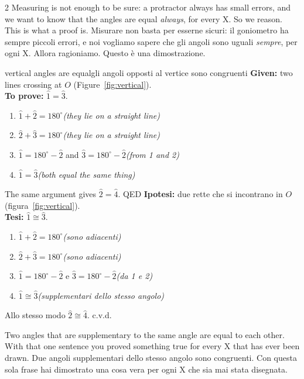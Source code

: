 \documentclass[10pt,a4paper,oneside]{book}
\newif\ifIT
\newenvironment{bi}%
  {\begin{paracol}{2}\global\ITfalse\selectlanguage{english}}%
  {\end{paracol}}
\newcommand{\IT}{\switchcolumn\global\ITtrue\selectlanguage{italian}}
\newcommand{\av}[1]{\widehat{#1}}           %
\newcommand{\step}[2]{\item #1\hfill{\small\color{slate}\itshape(#2)}}
\newenvironment{steps}{\begin{enumerate}[label=\arabic*., leftmargin=1.5em, itemsep=1pt]}{\end{enumerate}}
\begin{document}
\begin{bi}
Measuring is not enough to be sure: a protractor always has small errors, and we want to know that the angles are equal \emph{always}, for every X. So we reason. This is what a proof is.
\IT
Misurare non basta per esserne sicuri: il goniometro ha sempre piccoli errori, e noi vogliamo sapere che gli angoli sono uguali \emph{sempre}, per ogni X. Allora ragioniamo. Questo è una dimostrazione.
\end{bi}

\begin{proofbox}{vertical angles are equal}{gli angoli opposti al vertice sono congruenti}
\textbf{Given:} two lines crossing at $O$ (Figure~\ref{fig:vertical}).\\
\textbf{To prove:} $\av{1} = \av{3}$.
\begin{steps}
\step{$\av{1} + \av{2} = 180^\circ$}{they lie on a straight line}
\step{$\av{2} + \av{3} = 180^\circ$}{they lie on a straight line}
\step{$\av{1} = 180^\circ - \av{2}$ and $\av{3} = 180^\circ - \av{2}$}{from 1 and 2}
\step{$\av{1} = \av{3}$}{both equal the same thing}
\end{steps}
The same argument gives $\av{2} = \av{4}$. \hfill QED
\tcblower
\textbf{Ipotesi:} due rette che si incontrano in $O$ (figura~\ref{fig:vertical}).\\
\textbf{Tesi:} $\av{1} \cong \av{3}$.
\begin{steps}
\step{$\av{1} + \av{2} = 180^\circ$}{sono adiacenti}
\step{$\av{2} + \av{3} = 180^\circ$}{sono adiacenti}
\step{$\av{1} = 180^\circ - \av{2}$ e $\av{3} = 180^\circ - \av{2}$}{da 1 e 2}
\step{$\av{1} \cong \av{3}$}{supplementari dello stesso angolo}
\end{steps}
Allo stesso modo $\av{2} \cong \av{4}$. \hfill c.v.d.
\end{proofbox}

\begin{keyidea}{}{}
Two angles that are supplementary to the same angle are equal to each other. With that one sentence you proved something true for every X that has ever been drawn.
\tcblower
Due angoli supplementari dello stesso angolo sono congruenti. Con questa sola frase hai dimostrato una cosa vera per ogni X che sia mai stata disegnata.
\end{keyidea}
\end{document}
